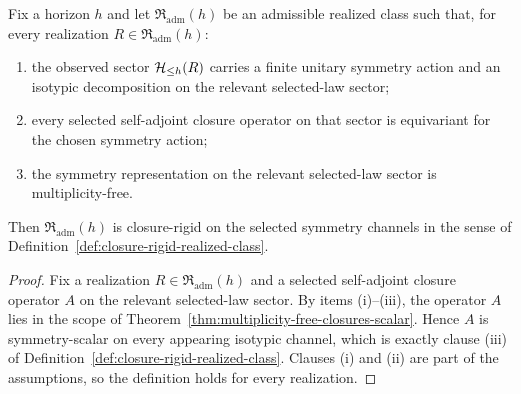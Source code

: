 \begin{corollary}
\label{cor:multiplicity-free-equivariant-closure-implies-rigid}
Fix a horizon $h$ and let $\mathfrak R_{\mathrm{adm}}(h)$ be an admissible
realized class such that, for every realization $R\in\mathfrak R_{\mathrm{adm}}(h)$:
\begin{enumerate}[label=(\roman*), leftmargin=2em, itemsep=0.2em]
\item the observed sector $\mathcal{H}_{\le h}(R)$ carries a finite unitary symmetry
      action and an isotypic decomposition on the relevant selected-law sector;
\item every selected self-adjoint closure operator on that sector is
      equivariant for the chosen symmetry action;
\item the symmetry representation on the relevant selected-law sector is
      multiplicity-free.
\end{enumerate}
Then $\mathfrak R_{\mathrm{adm}}(h)$ is closure-rigid on the selected symmetry
channels in the sense of
Definition~\ref{def:closure-rigid-realized-class}.
\end{corollary}

\begin{proof}
Fix a realization $R\in\mathfrak R_{\mathrm{adm}}(h)$ and a selected
self-adjoint closure operator $A$ on the relevant selected-law sector. By
items (i)--(iii), the operator $A$ lies in the scope of
Theorem~\ref{thm:multiplicity-free-closures-scalar}. Hence $A$ is
symmetry-scalar on every appearing isotypic channel, which is exactly clause
(iii) of Definition~\ref{def:closure-rigid-realized-class}. Clauses (i) and
(ii) are part of the assumptions, so the definition holds for every
realization.
\end{proof}

